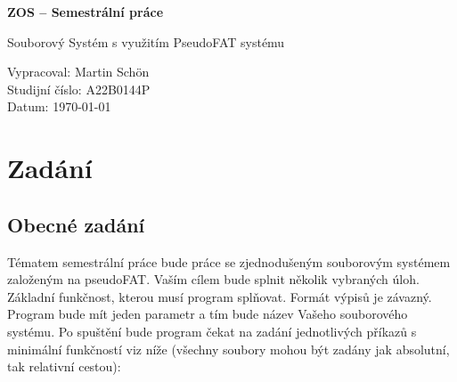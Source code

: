 \documentclass[12pt, a4paper]{article}
\newcommand{\Subject}{ZOS}
\newcommand{\TypeOfWork}{Semestrální práce}
\newcommand{\WorkFor}{\Subject\- -- \TypeOfWork}
\newcommand{\NameOfProject}{Souborový Systém s využitím PseudoFAT systému}
\newcommand{\Autor}{Martin Schön}
\newcommand{\Id}{A22B0144P}
\newcommand{\Date}{\today}
\begin{document}
\begin{titlepage}
    \begin{center}
        
        
        \vspace{2cm}
        
        \Huge
        \textbf{\WorkFor}
        
        \vspace{1cm}
        
        \LARGE
        \NameOfProject
        
        \vfill
        
        \vspace{0.5cm}
        
        \normalsize
        \raggedright
        Vypracoval: \Autor \\
        Studijní číslo: \Id \\
        Datum: \Date
        \vspace{0.2cm}
        
    \end{center}
\end{titlepage}
\thispagestyle{empty}
\pagebreak

\renewcommand{\cftsecleader}{\cftdotfill{\cftdotsep}}
\renewcommand{\cftsubsecleader}{\cftdotfill{\cftdotsep}}
\renewcommand{\cftsubsubsecleader}{\cftdotfill{\cftdotsep}}

\setcounter{page}{2}
\tableofcontents
\pagebreak

\section{Zadání}
\subsection{Obecné zadání}
Tématem semestrální práce bude práce se zjednodušeným souborovým systémem založeným na
pseudoFAT. Vaším cílem bude splnit několik vybraných úloh.
Základní funkčnost, kterou musí program splňovat. Formát výpisů je závazný.
Program bude mít jeden parametr a tím bude název Vašeho souborového systému. Po spuštění bude
program čekat na zadání jednotlivých příkazů s minimální funkčností viz níže (všechny soubory
mohou být zadány jak absolutní, tak relativní cestou):
\end{document}

